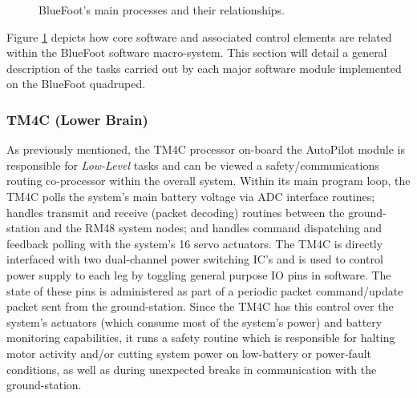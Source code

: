 		\begin{figure}[h!]
			\centering
			\caption{BlueFoot's main processes and their relationships.}
			\label{fig::process_diagram}
		\end{figure}

		Figure \ref{fig::process_diagram} depicts how core software and associated control elements are related within the BlueFoot software macro-system. This section will detail a general description of the tasks carried out by each major software module implemented on the BlueFoot quadruped.

			\subsubsection{TM4C (Lower Brain)}

			As previously mentioned, the TM4C processor on-board the AutoPilot module is responsible for \emph{Low-Level} tasks and can be viewed a safety/communications routing co-processor within the overall system. Within its main program loop, the TM4C polls the system's main battery voltage via ADC interface routines; handles transmit and receive (packet decoding) routines between the ground-station and the RM48 system nodes; and handles command dispatching and feedback polling with the system's 16 servo actuators. The TM4C is directly interfaced with two dual-channel power switching IC's and is used to control power supply to each leg by toggling general purpose IO pins in software. The state of these pins is administered as part of a periodic packet command/update packet sent from the ground-station. Since the TM4C has this control over the system's actuators (which consume most of the system's power) and battery monitoring capabilities, it runs a safety routine which is responsible for halting motor activity and/or cutting system power on low-battery or power-fault conditions, as well as during unexpected breaks in communication with the ground-station.

